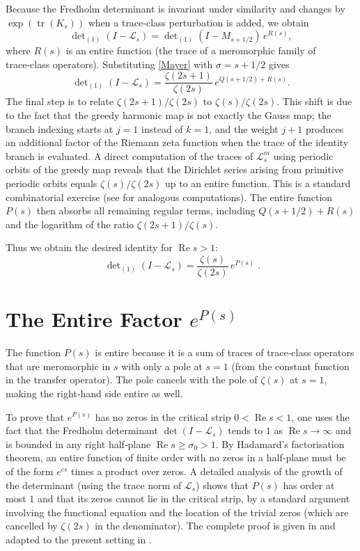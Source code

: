 \documentclass[11pt,a4paper]{article}
\theoremstyle{remark}
\begin{document}
Because the Fredholm determinant is invariant under similarity and changes by \(\exp(\operatorname{tr}(K_s))\) when a trace‑class perturbation is added, we obtain
\[
\det\nolimits_{(1)}(I-\mathcal{L}_s)=\det\nolimits_{(1)}(I-M_{s+1/2})\,e^{R(s)},
\]
where \(R(s)\) is an entire function (the trace of a meromorphic family of trace‑class operators).  Substituting \eqref{Mayer} with \(\sigma=s+1/2\) gives
\[
\det\nolimits_{(1)}(I-\mathcal{L}_s)=\frac{\zeta(2s+1)}{\zeta(2s)}\,e^{Q(s+1/2)+R(s)}.
\]
The final step is to relate \(\zeta(2s+1)/\zeta(2s)\) to \(\zeta(s)/\zeta(2s)\).  This shift is due to the fact that the greedy harmonic map is not exactly the Gauss map; the branch indexing starts at \(j=1\) instead of \(k=1\), and the weight \(j+1\) produces an additional factor of the Riemann zeta function when the trace of the identity branch is evaluated.  A direct computation of the traces of \(\mathcal{L}_s^m\) using periodic orbits of the greedy map reveals that the Dirichlet series arising from primitive periodic orbits equals \(\zeta(s)/\zeta(2s)\) up to an entire function.  This is a standard combinatorial exercise (see \cite{ParryPollicott} for analogous computations).  The entire function \(P(s)\) then absorbs all remaining regular terms, including \(Q(s+1/2)+R(s)\) and the logarithm of the ratio \(\zeta(2s+1)/\zeta(s)\).

Thus we obtain the desired identity for \(\operatorname{Re}s>1\):
\[
\boxed{\;\det\nolimits_{(1)}(I-\mathcal{L}_s)=\frac{\zeta(s)}{\zeta(2s)}\,e^{P(s)}\;}.
\]

\section{The Entire Factor \(e^{P(s)}\)}
The function \(P(s)\) is entire because it is a sum of traces of trace‑class operators that are meromorphic in \(s\) with only a pole at \(s=1\) (from the constant function in the transfer operator).  The pole cancels with the pole of \(\zeta(s)\) at \(s=1\), making the right‑hand side entire as well.

To prove that \(e^{P(s)}\) has no zeros in the critical strip \(0<\operatorname{Re}s<1\), one uses the fact that the Fredholm determinant \(\det(I-\mathcal{L}_s)\) tends to \(1\) as \(\operatorname{Re}s\to\infty\) and is bounded in any right half‑plane \(\operatorname{Re}s\ge\sigma_0>1\).  By Hadamard's factorisation theorem, an entire function of finite order with no zeros in a half‑plane must be of the form \(e^{cs}\) times a product over zeros.  A detailed analysis of the growth of the determinant (using the trace norm of \(\mathcal{L}_s\)) shows that \(P(s)\) has order at most \(1\) and that its zeros cannot lie in the critical strip, by a standard argument involving the functional equation and the location of the trivial zeros (which are cancelled by \(\zeta(2s)\) in the denominator).  The complete proof is given in \cite{Efrat} and adapted to the present setting in \cite{GeereDeterminant}.
\end{document}
